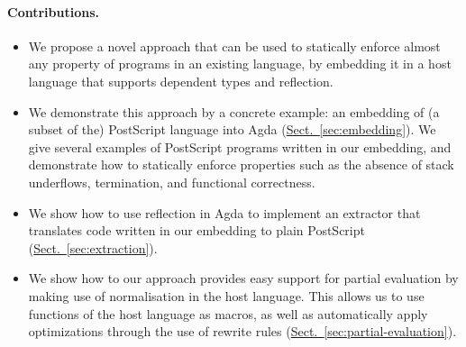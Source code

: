 \documentclass[sigplan,screen,anonymous,review]{acmart}
\newcommand{\myref}[2]{\hyperref[#2]{#1~\ref*{#2}}}
\newcommand{\secref}[1]{\myref{Sect.}{sec:#1}}
\begin{document}
\paragraph{Contributions.}
\begin{itemize}

\item We propose a novel approach that can be used to statically
  enforce almost any property of programs in an existing language, by
  embedding it in a host language that supports dependent types and
  reflection.

\item We demonstrate this approach by a concrete example: an embedding
  of (a subset of the) PostScript language into Agda
  (\secref{embedding}). We give several examples of PostScript
  programs written in our embedding, and demonstrate how to statically
  enforce properties such as the absence of stack underflows,
  termination, and functional correctness.

\item We show how to use reflection in Agda to implement an extractor
  that translates code written in our embedding to plain PostScript
  (\secref{extraction}).

\item We show how to our approach provides easy support for partial
  evaluation by making use of normalisation in the host language. This
  allows us to use functions of the host language as macros, as well
  as automatically apply optimizations through the use of rewrite
  rules (\secref{partial-evaluation}).
\end{itemize}

\begin{comment}
The rest of this paper is structured as follows. \secref{background}
provides background information on Agda and its reflection
capabilities. \secref{embedding} describes our embedding of PostScript
in Agda, and gives several examples of programs written in
it. \secref{extraction} shows how to implement an extractor for this
embedding using reflection. Next, \secref{partial-evaluation}
demonstrates how to apply partial evaluation to programs prior to
extraction by using Agda's normalisation procedure. Finally,
\secref{related} discusses related work and \secref{conclusion}
concludes.
\end{comment}

\begin{comment}
\todo[inline]{Move it somewhere}
This picture has been generated by the code that was extracted from our
Agda embedding.

\begin{center}
\epsfbox[0 0 64 64]{sierp.ps}
\end{center}
\end{comment}
\end{document}
